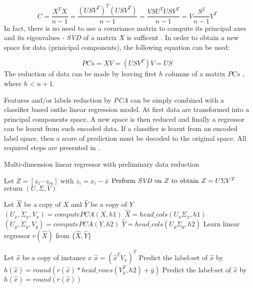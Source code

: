 \begin{equation}\label{eq:pca3}
    C=\frac{X^TX}{n-1} = \frac{(USV^T)^T(USV^T)}{n-1} = \frac{VSU^TUSV^T}{n-1} = V\frac{S^{2}}{n-1}V^{T} 
\end{equation}
In fact, there is no need to use a covariance matrix to compute its principal axes and its eigenvalues - \textit{SVD} of a matrix $X$ is sufficent \cite{Jolliffe}. In order to obtain a new space for data (prinicipal components), the following equation can be used:

\begin{equation}\label{eq:pca4}
    PCs = XV = (USV^{T})V = US
\end{equation}
The reduction of data can be made by leaving first $h$ columns of a matrix $PCs$ , where $h<n+1$.

Features and/or labels reduction by \textit{PCA} can be simply combined with a classifier based onthe linear regression model. At first data are transformed into a principal components space. A new space is then reduced and finally a regressor can be learnt from such encoded data. If a classifier is learnt from an encoded label space, then a score of prediction must be decoded to the original space. All required steps are presented in .

\begin{algorithm}
    \caption{Multi-dimension linear regressor with preliminary data reduction}\label{alg:pca1}
    \begin{algorithmic}[1]
        \State $\text{Let } Z=[z_1 \cdots z_m] \text{ with } z_i = x_i-\bar{x}$
        \State $\text{Perform \textit{SVD} on } Z \text{ to obtain } Z = U\Sigma{V^T}$
        \State $\text{return } (U,\Sigma,V)$
    \EndFunction
    \item[] 
        \State Let $\hat{X}$ be a copy of $X$ and $\hat{Y}$ be a copy of $Y$
        \State $(U_x, \Sigma_{x}, V_x) = computePCA(X,h1)$
        \State $\hat{X}=head\_cols(U_x\Sigma_{x}, h1)$
    \EndIf
        \State $(U_y, \Sigma_{y}, V_y) = computePCA(Y,h2)$
        \State $\hat{Y}=head\_cols(U_y\Sigma_{y}, h2)$
    \EndIf
    \State Learn linear regressor $r(\hat{X})$ from $\{\hat{X},\hat{Y}\}$
    \item[]
    \State Let $\hat{x}$ be a copy of instance $x$
    \State $\hat{x} = (\hat{x}^TV_x)^T$
    \EndIf
    \State Predict the label-set of $\hat{x}$ by $h(\hat{x})=round( r(\hat{x}) * head\_rows(V_y^T, h2) + \bar{y})$ 
    \Else
    \State Predict the label-set of $\hat{x}$ by $h(\hat{x})=round( r(\hat{x}) )$ 
    \EndIf

    \end{algorithmic}
\end{algorithm}

